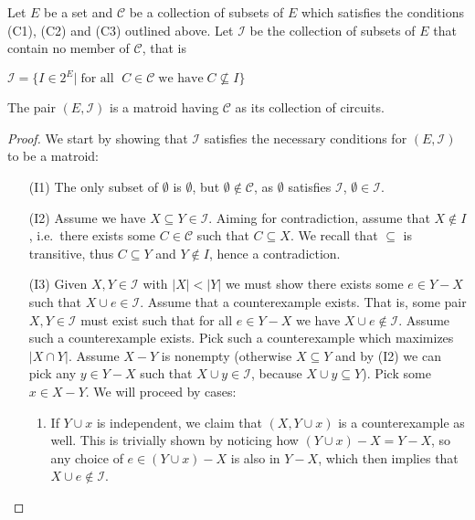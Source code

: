 \begin{theorem}\label{thm:matroid-circuit-definition}
Let $E$ be a set and $\mathcal C$ be a collection of subsets of $E$ which satisfies the conditions (C1), (C2) and (C3) outlined above. Let  $\mathcal I$  be the collection of subsets of $E$ that contain no member of $\mathcal C$, that is

\begin{center}
    $ \mathcal{I} = \{I \in 2^E |\; \text{for all } \; C \in \mathcal{C}\; \text{we have} \; C \not\subseteq I\}$
\end{center}
    The pair $(E,\mathcal I)$ is a matroid having $\mathcal C$ as its collection of circuits.
\end{theorem}

\begin{proof} We start by showing that $\mathcal I $ satisfies the necessary conditions for $(E, \mathcal I )$ to be a matroid:
    \begin{enumerate} 
        \item[(I1)] The only subset of $\emptyset $ is $ \emptyset $, but $ \emptyset \not\in \mathcal C $, as $ \emptyset $ satisfies $\mathcal{I}$, $\emptyset \in \mathcal I$.
        \item[(I2)] Assume we have $X \subseteq Y \in \mathcal I$. Aiming for contradiction, assume that $X \not\in I$, i.e.\ there exists some $C \in \mathcal C $ such that $C \subseteq X$. We recall that $\subseteq $ is transitive, thus $C \subseteq Y$ and $Y \not\in I$, hence a contradiction.
        \item[(I3)] Given $X, Y \in \mathcal I $ with $|X| < |Y|$ we must show there exists some $e \in Y - X$ such that $X \cup e \in \mathcal I$. Assume that a counterexample exists. That is, some pair $X, Y \in \mathcal I$ must exist such that for all $e \in Y - X$ we have $X \cup e \not\in \mathcal I$. Assume such a counterexample exists. Pick such a counterexample which maximizes $|X \cap Y|$. Assume $X - Y$ is nonempty (otherwise $X \subseteq Y$ and by (I2) we can pick any $ y\in Y - X$ such that $X \cup y \in \mathcal I$, because $X\cup y\subseteq Y$). Pick some $x \in X - Y$. We will proceed by cases:
          \begin{enumerate}
            \item If $Y \cup x$ is independent, we claim that $(X, Y \cup x)$ is a counterexample as well. This is trivially shown by noticing how $(Y \cup x) - X = Y - X$, so any choice of $e \in (Y \cup x) - X$ is also in $Y-X$, which then implies that $X\cup e\notin \mathcal{I}$.

\end{enumerate}
\end{enumerate}
\end{proof}
